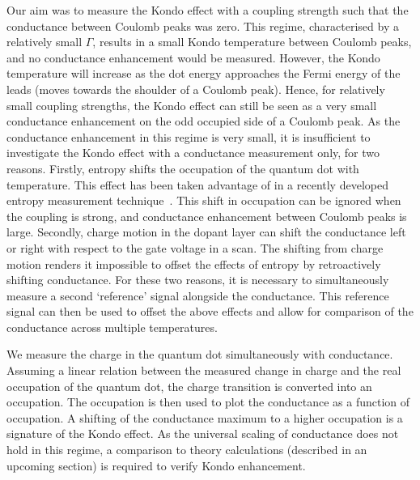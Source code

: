 Our aim was to measure the Kondo effect with a coupling strength such that the conductance between Coulomb peaks was zero. This regime, characterised by a relatively small $\Gamma$, results in a small Kondo temperature between Coulomb peaks, and no conductance enhancement would be measured. However, the Kondo temperature will increase as the dot energy approaches the Fermi energy of the leads (moves towards the shoulder of a Coulomb peak). Hence, for relatively small coupling strengths, the Kondo effect can still be seen as a very small conductance enhancement on the odd occupied side of a Coulomb peak. As the conductance enhancement in this regime is very small, it is insufficient to investigate the Kondo effect with a conductance measurement only, for two reasons. Firstly, entropy shifts the occupation of the quantum dot with temperature. This effect has been taken advantage of in a recently developed entropy measurement technique~\cite{hartman, child_strong, child_meas}. This shift in occupation can be ignored when the coupling is strong, and conductance enhancement between Coulomb peaks is large. Secondly, charge motion in the dopant layer can shift the conductance left or right with respect to the gate voltage in a scan. The shifting from charge motion renders it impossible to offset the effects of entropy by retroactively shifting conductance. For these two reasons, it is necessary to simultaneously measure a second `reference' signal alongside the conductance. This reference signal can then be used to offset the above effects and allow for comparison of the conductance across multiple temperatures. 

We measure the charge in the quantum dot simultaneously with conductance. Assuming a linear relation between the measured change in charge and the real occupation of the quantum dot, the charge transition is converted into an occupation. The occupation is then used to plot the conductance as a function of occupation. A shifting of the conductance maximum to a higher occupation is a signature of the Kondo effect. 
As the universal scaling of conductance does not hold in this regime, a comparison to theory calculations (described in an upcoming section) is required to verify Kondo enhancement. 





